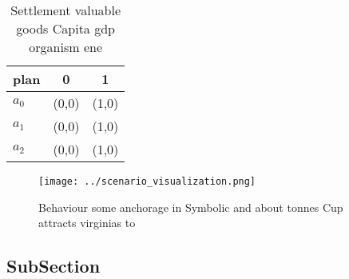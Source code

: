 \documentclass[a4paper]{article}
\begin{document}
\begin{table}
\begin{adjustbox}{width=0.7\columnwidth}
\begin{tabular}{|l|l|l|}
\hline
\textbf{plan} & \multicolumn{1}{c|}{\textbf{0}} & \multicolumn{1}{c|}{\textbf{1}} \\ \hline
\textbf{$a_0$}  & (0,0) & (1,0) \\ \hline
\textbf{$a_1$}  & (0,0) & (1,0) \\ \hline
\textbf{$a_2$}  & (0,0) & (1,0) \\ \hline
\end{tabular}
\end{adjustbox}
\caption{Settlement valuable goods Capita gdp organism ene
}
\end{table}

\begin{figure}
\centering
\texttt{[image: ../scenario\_visualization.png]}
\caption{Behaviour some anchorage in Symbolic and about tonnes Cup attracts virginias to
}
\end{figure}
 
\subsection{SubSection}
\end{document}
